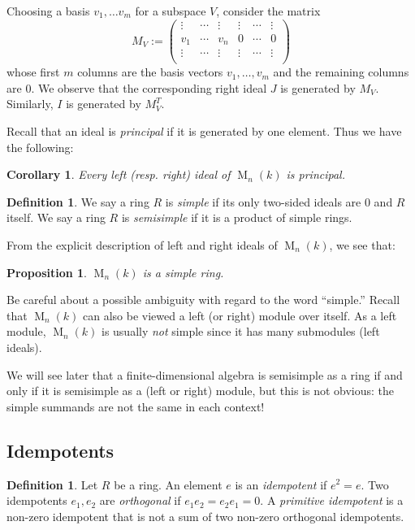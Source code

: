 \documentclass[12pt]{article}
\theoremstyle{plain}
\newtheorem{proposition}[theorem]{Proposition}
\newtheorem{corollary}[theorem]{Corollary}
\theoremstyle{definition}
\newtheorem{definition}[theorem]{Definition}
\theoremstyle{remark}
\numberwithin{equation}{section}
\begin{document}
Choosing a basis $v_1,\ldots v_m$ for a subspace $V$, consider the matrix
\[
M_V := \begin{pmatrix}
\vdots & \cdots & \vdots & \vdots & \cdots & \vdots\\
v_1 & \cdots & v_n & 0 & \cdots & 0\\
\vdots & \cdots & \vdots & \vdots & \cdots & \vdots\\
\end{pmatrix} 
\]
whose first $m$ columns are the basis vectors $v_1,\ldots,v_m$ and the
remaining columns are $0$.
We observe that the corresponding right ideal $J$ is generated by $M_V$.
Similarly, $I$ is generated by $M_V^T$.

Recall that an ideal is \emph{principal}
if it is generated by one element.
Thus we have the following:

\begin{corollary}
Every left (resp. right) ideal of $\operatorname{M}_n(k)$ is principal.
\end{corollary}

\begin{definition}
We say a ring $R$ is \emph{simple} if its only two-sided ideals are $0$ and
$R$ itself.
We say a ring $R$ is \emph{semisimple} if it is a product of
simple rings.
\end{definition}

From the explicit description of left and right ideals
of $\operatorname{M}_n(k)$, we see that:

\begin{proposition}
$\operatorname{M}_n(k)$ is a simple ring.
\end{proposition}

Be careful about a possible ambiguity with regard to the word
``simple.''
Recall that $\operatorname{M}_n(k)$ can also be viewed a left (or right)
module over itself.
As a left module,
$\operatorname{M}_n(k)$ is usually \emph{not} simple since it has many
submodules (left ideals).

We will see later that a finite-dimensional algebra is semisimple as a ring if
and only if it is semisimple as a (left or right) module,
but this is not obvious: the simple summands are not the same in each
context!

\subsection{Idempotents}

\begin{definition}
Let $R$ be a ring.  An element $e$ is an \emph{idempotent} if $e^2=e$.
Two idempotents $e_1,e_2$ are \emph{orthogonal} if $e_1e_2=e_2e_1=0$.
A \emph{primitive idempotent} is a non-zero idempotent
that is not a sum of two non-zero orthogonal idempotents.
\end{definition}
\end{document}
